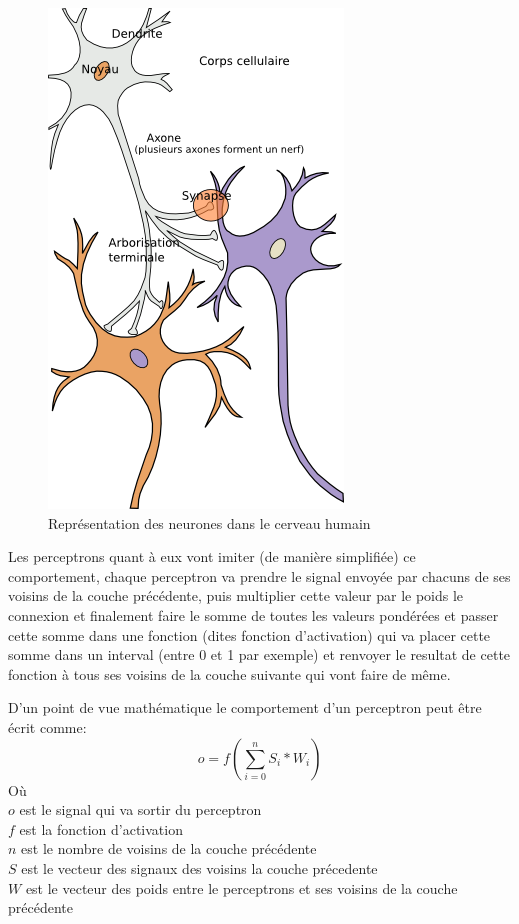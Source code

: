 \documentclass{article}
\begin{document}
\begin{figure}[h]
\begin{center}
	\includegraphics[scale=0.5]{neurones.png}
	\caption{Représentation des neurones dans le cerveau humain \cite{neurons}}
\end{center}
\end{figure}

Les perceptrons quant à eux vont imiter (de manière simplifiée) ce comportement, chaque perceptron va prendre le signal envoyée par chacuns de ses voisins de la couche précédente, puis multiplier cette valeur par le poids le connexion et finalement faire le somme de toutes les valeurs pondérées et passer cette somme dans une fonction (dites fonction d'activation) qui va placer cette somme dans un interval (entre 0 et 1 par exemple) et renvoyer le resultat de cette fonction à tous ses voisins de la couche suivante qui vont faire de même.\cite{wikiperceptron}

D'un point de vue mathématique le comportement d'un perceptron peut être écrit comme:
\begin{equation}
o = f(\sum_{i=0}^{n} S_i * W_i)
\end{equation}
Où\\
$o$ est le signal qui va sortir du perceptron\\
$f$ est la fonction d'activation\\
$n$ est le nombre de voisins de la couche précédente\\
$S$ est le vecteur des signaux des voisins la couche précedente\\
$W$ est le vecteur des poids entre le perceptrons et ses voisins de la couche précédente
\end{document}
